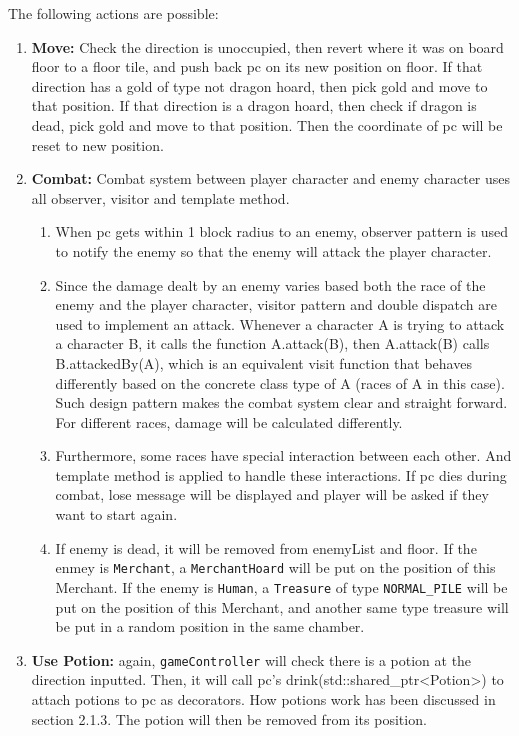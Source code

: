 \documentclass[11pt]{article}
\theoremstyle{plain} \newtheorem{theorem*}{Theorem}[subsection]
\begin{document}
The following actions are possible: 
\begin{enumerate}[leftmargin=*]
\item 
\textbf{Move:} 
Check the direction is unoccupied, then revert where it was on
board \textsf{floor} to a floor tile, and push back pc on its new position on
\textsf{floor}. If that direction has a gold of type not dragon hoard, then
pick gold and move to that position. If that direction is a dragon hoard, then
check if dragon is dead, pick gold and move to that position. Then the 
coordinate of \textsf{pc} will be reset to new position.

\item
\textbf{Combat:} 
Combat system between player character and enemy character uses all
observer, visitor and template method. 
\begin{enumerate}[leftmargin=*, noitemsep, label=(\roman*)]
\item
When \textsf{pc} gets within 1 block radius to an enemy, observer pattern
is used to notify the enemy so that the enemy will attack the player character.
\item
Since the damage dealt by an enemy varies based both the race of the enemy and
the player character, visitor pattern and double dispatch are used to implement
an attack. Whenever a character A is trying to attack a character B, it calls
the function \textsf{A.attack(B)}, then \textsf{A.attack(B)} calls \textsf{B.attackedBy(A)}, which is an
equivalent visit function that behaves differently based on the concrete class
type of A (races of A in this case). Such design pattern makes the combat
system clear and straight forward. For different races, damage will be
calculated differently. 
\item 
Furthermore, some races have special interaction
between each other. And template method is applied to handle these interactions.
If pc dies during combat, lose message will be displayed and player will be
asked if they want to start again. 
\item
If enemy is dead, it will be removed from
\textsf{enemyList} and \textsf{floor}. If the enmey is \texttt{Merchant}, 
a \texttt{MerchantHoard} will be put on the position of this Merchant.
If the enemy is \texttt{Human}, a \texttt{Treasure} of type \texttt{NORMAL\_PILE}
will be put on the position of this Merchant, and another 
same type treasure will be put in a random position in the same chamber.
\end{enumerate}

\item
\textbf{Use Potion:}
again, \texttt{gameController} will check there is a potion
at the direction inputted. Then, it will call \textsf{pc}'s
\textsf{drink(std::shared\_ptr<Potion>)} to attach potions to \textsf{pc} as 
decorators. How potions work has been discussed in section 2.1.3. The potion
will then be removed from its position. 
\end{enumerate}
\end{document}
